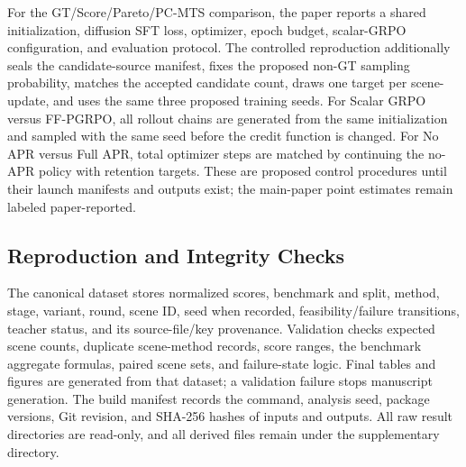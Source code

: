 For the GT/Score/Pareto/PC-MTS comparison, the paper reports a shared
initialization, diffusion SFT loss, optimizer, epoch budget, scalar-GRPO
configuration, and evaluation protocol.  The controlled reproduction
additionally seals the candidate-source manifest, fixes the proposed non-GT
sampling probability, matches the accepted candidate count, draws one target
per scene-update, and uses the same three proposed training seeds.  For Scalar GRPO versus FF-PGRPO, all rollout
chains are generated from the same initialization and sampled with the same
seed before the credit function is changed.  For No APR versus Full APR, total
optimizer steps are matched by continuing the no-APR policy with retention
targets.  These are proposed control procedures until their launch manifests
and outputs exist; the main-paper point estimates remain labeled
paper-reported.

\subsection{Reproduction and Integrity Checks}
\label{sec:reproduction-checks}

The canonical dataset stores normalized scores, benchmark and split, method,
stage, variant, round, scene ID, seed when recorded, feasibility/failure
transitions, teacher status, and its source-file/key provenance.  Validation
checks expected scene counts, duplicate scene-method records, score ranges,
the benchmark aggregate formulas, paired scene sets, and failure-state logic.
Final tables and figures are generated from that dataset; a validation failure
stops manuscript generation.  The build manifest records the command, analysis
seed, package versions, Git revision, and SHA-256 hashes of inputs and outputs.
All raw result directories are read-only, and all derived files remain under
the supplementary directory.
